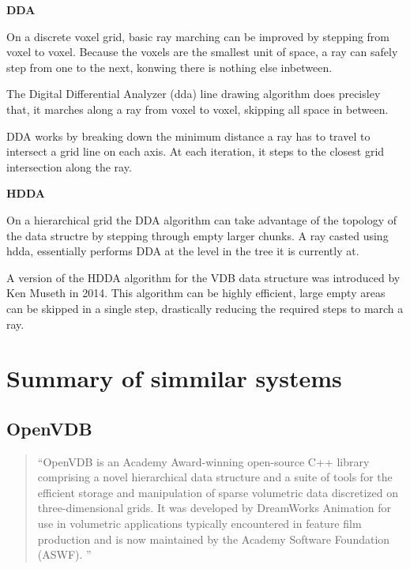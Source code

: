 \vspace{0.5cm}
\label{def:dda}
\textbf{DDA}

On a discrete voxel grid, basic ray marching can be improved by stepping from voxel to voxel. Because the voxels are the smallest unit of space, a ray can safely step from one to the next, konwing there is nothing else inbetween.

The Digital Differential Analyzer (\acrshort{dda}) line drawing algorithm does precisley that, it marches along a ray from voxel to voxel, skipping all space in between.

DDA works by breaking down the minimum distance a ray has to travel to intersect a grid line on each axis.
At each iteration, it steps to the closest grid intersection along the ray.

\vspace{0.5cm}
\label{def:hdda}
\textbf{HDDA}

On a hierarchical grid the DDA algorithm can take advantage of the topology of the data structre by stepping through empty larger chunks.
A ray casted using \acrshort{hdda}, essentially performs DDA at the level in the tree it is currently at.

A version of the HDDA algorithm for the VDB data structure was introduced by Ken Museth in 2014\supercite{vdb2014}.
This algorithm can be highly efficient, large empty areas can be skipped in a single step, drastically reducing the required steps to march a ray.

\section{Summary of simmilar systems}
\subsection{OpenVDB\supercite{openvdb:doc}}

\begin{quote}
``OpenVDB is an Academy Award-winning open-source C++ library comprising a novel hierarchical data structure and a suite of tools for the efficient storage and manipulation of sparse volumetric data discretized on three-dimensional grids. It was developed by DreamWorks Animation for use in volumetric applications typically encountered in feature film production and is now maintained by the Academy Software Foundation (ASWF).
''
\end{quote}

